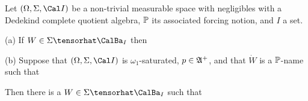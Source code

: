  Let $(\Omega,\Sigma,\Cal I)$ be a
non-trivial measurable space
with negligibles with a Dedekind complete quotient 
algebra,
$\Bbb P$ its associated forcing notion, and $I$ a set.

(a) If $W\in\Sigma\tensorhat\CalBa_I$ then


(b) Suppose that $(\Omega,\Sigma,\Cal I)$ is $\omega_1$-saturated,
$p\in\frak A^+$, and that
$\dot W$ is a $\Bbb P$-name such that


\noindent Then there is a $W\in\Sigma\tensorhat\CalBa_I$ such that


